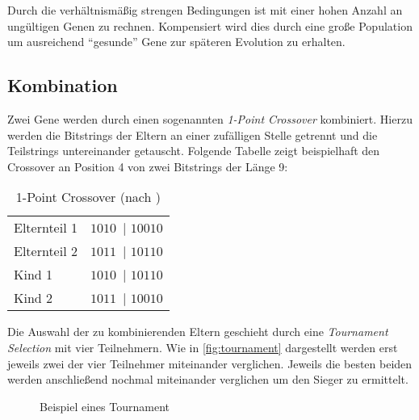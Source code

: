 Durch die verhältnismäßig strengen Bedingungen ist mit einer hohen Anzahl an ungültigen Genen zu rechnen.
Kompensiert wird dies durch eine große Population um ausreichend \enquote{gesunde} Gene zur späteren Evolution zu erhalten.




\subsection{Kombination}\label{sec:evol-alg-kombi}
Zwei Gene werden durch einen sogenannten \emph{1-Point Crossover} \cite{AJ2015} kombiniert.
Hierzu werden die Bitstrings der Eltern an einer zufälligen Stelle getrennt und die Teilstrings untereinander getauscht.
Folgende Tabelle zeigt beispielhaft den Crossover an Position 4 von zwei Bitstrings der Länge 9:

\begin{table}[ht]
    \begin{center}
        \begin{tabular}{l c}
            Elternteil 1 & \colorbox{lime!30}{$1010$~}$\mid$\colorbox{lime!30}{ $10010$} \\
            Elternteil 2 & \colorbox{cyan!30}{$1011$~}$\mid$\colorbox{cyan!30}{ $10110$} \\
            \hline
            Kind 1       & \colorbox{lime!30}{$1010$~}$\mid$\colorbox{cyan!30}{ $10110$} \\
            Kind 2       & \colorbox{cyan!30}{$1011$~}$\mid$\colorbox{lime!30}{ $10010$} \\
        \end{tabular}
    \end{center}
    \caption{1-Point Crossover (nach \cite{AJ2015})}
\end{table}

Die Auswahl der zu kombinierenden Eltern geschieht durch eine \emph{Tournament Selection} mit vier Teilnehmern.
Wie in \autoref{fig:tournament} dargestellt werden erst jeweils zwei der vier Teilnehmer miteinander verglichen.
Jeweils die besten beiden werden anschließend nochmal miteinander verglichen um den Sieger zu ermittelt.

\begin{figure}[h]
    \centering
    \caption{Beispiel eines Tournament}
    \label{fig:tournament}
\end{figure}

